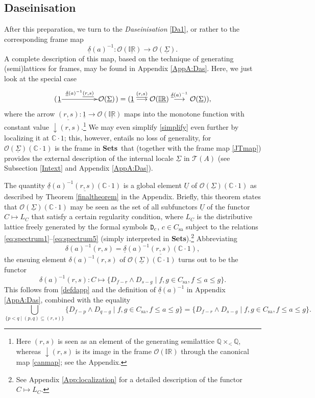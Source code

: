 \documentclass[11pt]{article}
\newcommand{\IR}{\mathbb{IR}}
\newcommand{\Q}{\mathbb{Q}}
\newcommand{\uIR}{\underline{\mathbb{IR}}}
\newcommand{\beq}{\begin{equation}}
\newcommand{\eeq}{\end{equation}}
\newcommand{\Sets}{\mbox{\textbf{Sets}}}
\newcommand{\sr}{\stackrel}
\newcommand{\raw}{\rightarrow} \newcommand{\rat}{\mapsto}
\newcommand{\x}{\times} \newcommand{\hb}{\hbar}
\newcommand{\inv}{^{-1}}
\newcommand{\er}{\eqref}
\newcommand{\dl}{\delta} \newcommand{\Dl}{\Delta}
\newcommand{\CO}{{\mathcal O}} \newcommand{\CP}{{\mathcal P}}
\newcommand{\C}{{\mathbb C}} \newcommand{\D}{{\mathbb D}}
\newcommand{\alg}[1]{\ensuremath{#1}}
\newcommand{\functor}[1]{\ensuremath{\underline{#1}}}
\newcommand{\asstopos}{\ensuremath{\mathcal{T}}}
\newcommand{\sa}{\ensuremath{_{\mathrm{sa}}}}
\newcommand{\prop}[1]{\ensuremath{\mbox{\texttt{#1}}}}
\newcommand{\TA}{\mathcal{T}(A)}
\newcommand{\ulS}{\functor{\Sigma}}
\renewcommand{\TA}{\asstopos(\alg{A})}
\begin{document}
\subsection{Daseinisation}\label{sec:Das}
After this preparation, we turn to the
{\it Daseinisation} \er{Da1}, or rather to the corresponding frame map
 \beq
\underline{\dl}(a)\inv:  \CO(\underline{\IR}) \raw \CO(\ulS).\label{Da22}\eeq
A complete description of this map, based on the technique of generating (semi)lattices for frames, may be found in Appendix \ref{AppA:Das}. Here, we 
 just look at  the special case
\beq (\xymatrix@1{\underline{1}\ar^-{\underline{\dl}(a)\inv \underline{(r,s)}}[rr] &&  \CO(\ulS)})
= (\underline{1}\sr{\underline{(r,s)}}{\longrightarrow}\CO(\uIR)\sr{\underline{\dl}(a)\inv}{\longrightarrow}\CO(\ulS)),
\label{simplify}
\eeq
where the arrow $\underline{(r,s)}:\underline{1}\raw \CO(\uIR)$ maps into the monotone function  with constant value $\downarrow\!(r,s)$.\footnote{Here $(r,s)$ is seen as an element of the generating semilattice $\Q\x_{<}\Q$, whereas
$\downarrow\!(r,s)$ is its image in the frame $\CO(\IR)$ through the canonical map \er{canmap}; see the Appendix.} 
We may even simplify  \er{simplify} even further by localizing it  at $\C\cdot 1$; this,  however, entails no loss of generality, 
for $\CO(\ulS)(\C\cdot 1)$ is the frame in \Sets\ that (together with the frame map \er{JTmap}) provides the external description
of the internal locale $\ulS$ in $\TA$ (see Subsection \ref{Intext} and Appendix  \ref{AppA:Das}).

The quantity $\underline{\dl}(a)\inv \underline{(r,s)}(\C\cdot 1)$
 is a global element $\underline{U}$ of $\CO(\ulS)(\C\cdot 1)$ as described by Theorem \ref{finaltheorem}
 in the Appendix. Briefly, this theorem states that $\CO(\ulS)(\C\cdot 1)$ may be seen as the set of all subfunctors $\underline{U}$ of the functor $C\mapsto L_C$ that satisfy a certain regularity condition,
 where $L_C$ is the  distributive lattice  freely generated by the formal symbols $\prop{D}_c$, $c\in C\sa$ subject to the relations \er{eq:spectrum1}--\er{eq:spectrum5} (simply interpreted in \Sets).\footnote{See Appendix \ref{App:localization}
 for a detailed description of the functor $C\mapsto L_C$.}
 Abbreviating
\beq
\dl(a)\inv(r,s)=\underline{\dl}(a)\inv \underline{(r,s)}(\C\cdot 1),
\eeq
 the ensuing element $\dl(a)\inv(r,s)$ of $\CO(\ulS)(\C\cdot 1)$ turns out to be the functor
\beq
\dl(a)\inv(r,s): C \mapsto \{{D}_{f-r} \wedge
 {D}_{s-g}\mid f,g\in C\sa, f \leqslant a \leqslant g\}.
\label{Da}
\eeq
This follows from \er{defdapp} and the definition of $\underline{\dl}(a)\inv$
 in Appendix \ref{AppA:Das}, combined with the equality
$$ \bigcup_{\{p<q\mid (p,q)\subseteq (r,s)\}}  \{{D}_{f-p} \wedge
 {D}_{q-g}\mid f,g\in C\sa, f \leqslant a \leqslant g\}=\{{D}_{f-r} \wedge
 {D}_{s-g}\mid f,g\in C\sa, f \leqslant a \leqslant g\}.$$
\end{document}
